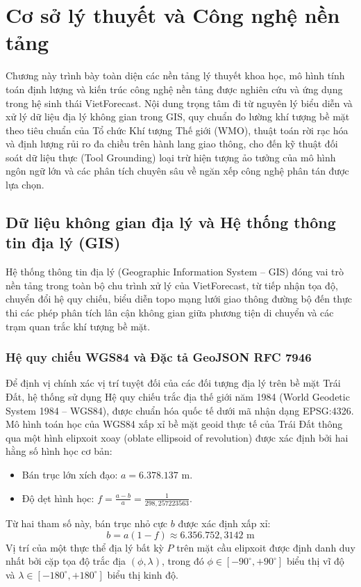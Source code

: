\chapter{Cơ sở lý thuyết và Công nghệ nền tảng}
\label{ch:theory}

Chương này trình bày toàn diện các nền tảng lý thuyết khoa học, mô hình tính toán định lượng và kiến trúc công nghệ nền tảng được nghiên cứu và ứng dụng trong hệ sinh thái VietForecast. Nội dung trọng tâm đi từ nguyên lý biểu diễn và xử lý dữ liệu địa lý không gian trong GIS, quy chuẩn đo lường khí tượng bề mặt theo tiêu chuẩn của Tổ chức Khí tượng Thế giới (WMO), thuật toán rời rạc hóa và định lượng rủi ro đa chiều trên hành lang giao thông, cho đến kỹ thuật đối soát dữ liệu thực (Tool Grounding) loại trừ hiện tượng ảo tưởng của mô hình ngôn ngữ lớn và các phân tích chuyên sâu về ngăn xếp công nghệ phân tán được lựa chọn.

\section{Dữ liệu không gian địa lý và Hệ thống thông tin địa lý (GIS)}

Hệ thống thông tin địa lý (Geographic Information System -- GIS) đóng vai trò nền tảng trong toàn bộ chu trình xử lý của VietForecast, từ tiếp nhận tọa độ, chuyển đổi hệ quy chiếu, biểu diễn topo mạng lưới giao thông đường bộ đến thực thi các phép phân tích lân cận không gian giữa phương tiện di chuyển và các trạm quan trắc khí tượng bề mặt.

\subsection{Hệ quy chiếu WGS84 và Đặc tả GeoJSON RFC 7946}

Để định vị chính xác vị trí tuyệt đối của các đối tượng địa lý trên bề mặt Trái Đất, hệ thống sử dụng Hệ quy chiếu trắc địa thế giới năm 1984 (World Geodetic System 1984 -- WGS84), được chuẩn hóa quốc tế dưới mã nhận dạng EPSG:4326. Mô hình toán học của WGS84 xấp xỉ bề mặt geoid thực tế của Trái Đất thông qua một hình elipxoit xoay (oblate ellipsoid of revolution) được xác định bởi hai hằng số hình học cơ bản:
\begin{itemize}
    \item[-] Bán trục lớn xích đạo: $a = 6.378.137\text{ m}$.
    \item[-] Độ dẹt hình học: $f = \frac{a - b}{a} = \frac{1}{298{,}257223563}$.
\end{itemize}
Từ hai tham số này, bán trục nhỏ cực $b$ được xác định xấp xỉ:
\begin{equation}
\label{eq:minor_axis_vi}
b = a(1 - f) \approx 6.356.752{,}3142\text{ m}
\end{equation}
Vị trí của một thực thể địa lý bất kỳ $P$ trên mặt cầu elipxoit được định danh duy nhất bởi cặp tọa độ trắc địa $(\phi, \lambda)$, trong đó $\phi \in [-90^\circ, +90^\circ]$ biểu thị vĩ độ và $\lambda \in [-180^\circ, +180^\circ]$ biểu thị kinh độ.

